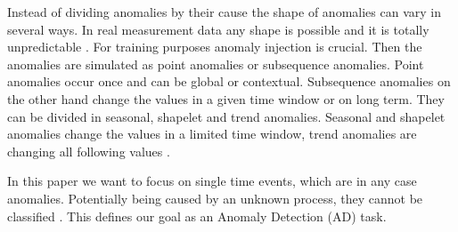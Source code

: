 Instead of dividing anomalies by their cause the shape of anomalies can vary in several ways. In real measurement data any shape is possible and it is totally unpredictable . For training purposes anomaly injection is crucial. Then the anomalies are simulated as point anomalies or subsequence anomalies. Point anomalies occur once and can be global or contextual. Subsequence anomalies on the other hand change the values in a given time window or on long term. They can be divided in seasonal, shapelet and trend anomalies. Seasonal and shapelet anomalies change the values in a limited time window, trend anomalies are changing all following values . %

In this paper we want to focus on single time events, which are in any case anomalies. Potentially being caused by an unknown process, they cannot be classified . This defines our goal as an Anomaly Detection (AD) task.

